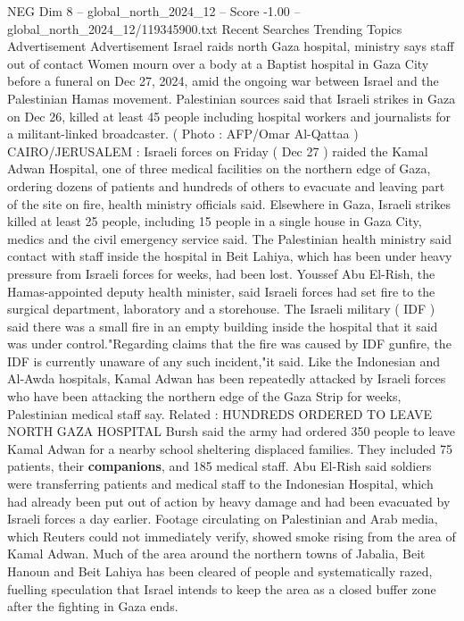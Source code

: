 \begin{textsample}{NEG Dim 8 – global\_north\_2024\_12 – Score -1.00 – global\_north\_2024\_12/119345900.txt}  \label{ex:f8_neg_112}
Recent Searches Trending Topics Advertisement Advertisement Israel raids north Gaza hospital, ministry says staff out of contact Women mourn over a body at a Baptist hospital in Gaza City before a funeral on Dec 27, 2024, amid the ongoing war between Israel and the Palestinian Hamas movement.
Palestinian sources said that Israeli strikes in Gaza on Dec 26, killed at least 45 people including hospital workers and journalists for a militant-linked broadcaster. ( Photo : AFP/Omar Al-Qattaa ) CAIRO/JERUSALEM : Israeli forces on Friday ( Dec 27 ) raided the Kamal Adwan Hospital, one of three medical facilities on the northern edge of Gaza, ordering dozens of patients and hundreds of others to evacuate and leaving part of the site on fire, health ministry officials said.
Elsewhere in Gaza, Israeli strikes killed at least 25 people, including 15 people in a single house in Gaza City, medics and the civil emergency service said.
The Palestinian health ministry said contact with staff inside the hospital in Beit Lahiya, which has been under heavy pressure from Israeli forces for weeks, had been lost.
Youssef Abu El-Rish, the Hamas-appointed deputy health minister, said Israeli forces had set fire to the surgical department, laboratory and a storehouse.
The Israeli military ( IDF ) said there was a small fire in an empty building inside the hospital that it said was under control."Regarding claims that the fire was caused by IDF gunfire, the IDF is currently unaware of any such incident,"it said.
Like the Indonesian and Al-Awda hospitals, Kamal Adwan has been repeatedly attacked by Israeli forces who have been attacking the northern edge of the Gaza Strip for weeks, Palestinian medical staff say.
Related : HUNDREDS ORDERED TO LEAVE NORTH GAZA HOSPITAL Bursh said the army had ordered 350 people to leave Kamal Adwan for a nearby school sheltering displaced families.
They included 75 patients, their \textbf{companions}, and 185 medical staff.
Abu El-Rish said soldiers were transferring patients and medical staff to the Indonesian Hospital, which had already been put out of action by heavy damage and had been evacuated by Israeli forces a day earlier.
Footage circulating on Palestinian and Arab media, which Reuters could not immediately verify, showed smoke rising from the area of Kamal Adwan.
Much of the area around the northern towns of Jabalia, Beit Hanoun and Beit Lahiya has been cleared of people and systematically razed, fuelling speculation that Israel intends to keep the area as a closed buffer zone after the fighting in Gaza ends.

\end{textsample}
